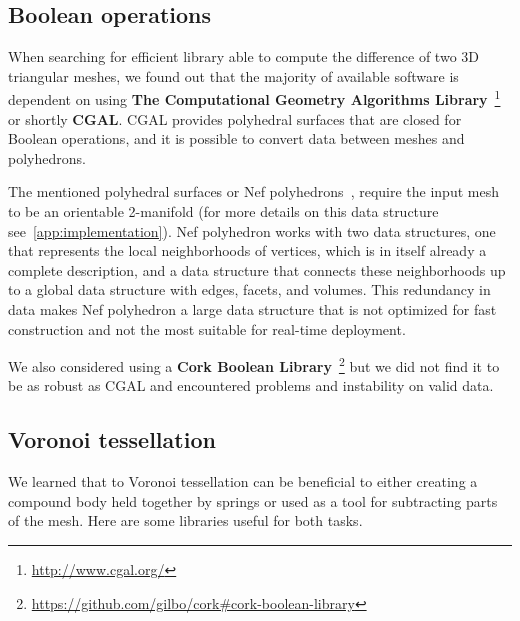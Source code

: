 \subsection{Boolean operations}
When searching for efficient library able to compute the difference of two 3D triangular meshes, we found out that the majority of available software
is dependent on using \textbf{The Computational Geometry Algorithms Library}~\footnote{\url{http://www.cgal.org/}} or shortly \textbf{CGAL}. CGAL provides polyhedral surfaces that are closed for Boolean operations, and it is possible to convert data between meshes and polyhedrons. 

The mentioned polyhedral surfaces or Nef polyhedrons~\cite{nefpoly}, require the input mesh to be an orientable 2-manifold (for more details on this data structure see~\cref{app:implementation}). Nef polyhedron works with two data structures, one that represents the local neighborhoods of vertices, which is in itself already a complete description, and a data structure that connects these neighborhoods up to a global data structure with edges, facets, and volumes. This redundancy in data makes Nef polyhedron a large data structure that is not optimized for fast construction and not the most suitable for real-time deployment.

We also considered using a \textbf{Cork Boolean Library}~\footnote{\url{https://github.com/gilbo/cork\#cork-boolean-library}} but we did not find it to be as robust as CGAL and encountered problems and instability on valid data.

\subsection{Voronoi tessellation}
We learned that to Voronoi tessellation can be beneficial to either creating a compound body held together by springs or used as a tool for subtracting parts of the mesh. Here are some libraries useful for both tasks.

